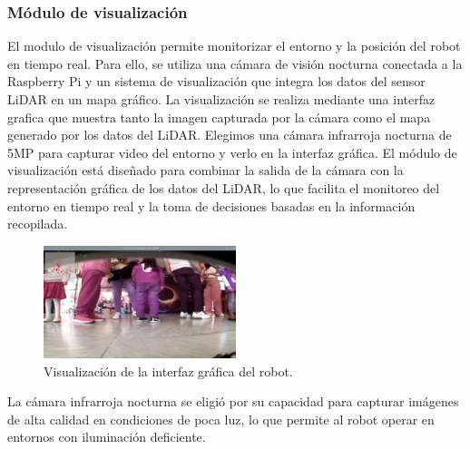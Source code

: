     \subsubsection{M\'odulo de visualizaci\'on} %
    \label{ssub:modvis}
    El modulo de visualizaci\'on permite monitorizar el entorno y la posici\'on del robot en
        tiempo real. Para ello, se utiliza una c\'amara de visi\'on nocturna conectada a la
        Raspberry Pi y un sistema de visualizaci\'on que integra los datos del sensor LiDAR en
        un mapa gr\'afico. La visualizaci\'on se realiza mediante una interfaz grafica que muestra
        tanto la imagen capturada por la c\'amara como el mapa generado por los datos del
        LiDAR.
    \vskip 0.5cm
    Elegimos una c\'amara infrarroja nocturna de 5MP para capturar video del entorno y
        verlo en la interfaz gr\'afica.
    \vskip 0.5cm
    El m\'odulo de visualizaci\'on est\'a dise\~nado para combinar la salida de la c\'amara con la
        representaci\'on gr\'afica de los datos del LiDAR, lo que facilita el monitoreo del entorno
        en tiempo real y la toma de decisiones basadas en la informaci\'on recopilada.
    \vskip 0.5cm
    \begin{figure}[htbp]
        \centering
        \includegraphics[width=0.5\textwidth]{./images/Pruebas/robot/robot02.jpeg}
        \caption{Visualizaci\'on de la interfaz gr\'afica del robot.}
        \label{fig:robot}
    \end{figure}
    La c\'amara infrarroja nocturna se eligi\'o por su capacidad para capturar im\'agenes de alta
        calidad en condiciones de poca luz, lo que permite al robot operar en entornos con
        iluminaci\'on deficiente.
    \vskip 0.5cm
